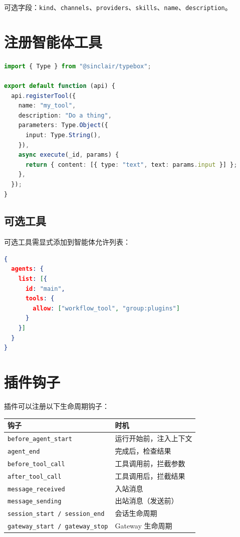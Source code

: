 可选字段：\texttt{kind}、\texttt{channels}、\texttt{providers}、\texttt{skills}、\texttt{name}、\texttt{description}。

\section{注册智能体工具}

\begin{lstlisting}[language=typescript]
import { Type } from "@sinclair/typebox";

export default function (api) {
  api.registerTool({
    name: "my_tool",
    description: "Do a thing",
    parameters: Type.Object({
      input: Type.String(),
    }),
    async execute(_id, params) {
      return { content: [{ type: "text", text: params.input }] };
    },
  });
}
\end{lstlisting}

\subsection{可选工具}

可选工具需显式添加到智能体允许列表：

\begin{lstlisting}[language=json]
{
  agents: {
    list: [{
      id: "main",
      tools: {
        allow: ["workflow_tool", "group:plugins"]
      }
    }]
  }
}
\end{lstlisting}

\section{插件钩子}

插件可以注册以下生命周期钩子：

\begin{center}
\begin{tabular}{ll}
\toprule
\textbf{钩子} & \textbf{时机} \\
\midrule
\texttt{before\_agent\_start} & 运行开始前，注入上下文 \\
\texttt{agent\_end} & 完成后，检查结果 \\
\texttt{before\_tool\_call} & 工具调用前，拦截参数 \\
\texttt{after\_tool\_call} & 工具调用后，拦截结果 \\
\texttt{message\_received} & 入站消息 \\
\texttt{message\_sending} & 出站消息（发送前） \\
\texttt{session\_start / session\_end} & 会话生命周期 \\
\texttt{gateway\_start / gateway\_stop} & Gateway 生命周期 \\
\bottomrule
\end{tabular}
\end{center}

